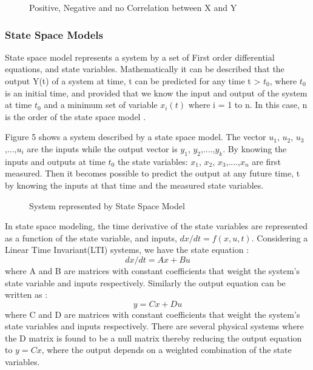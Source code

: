 \documentclass[article,type=msc,colorback,12pt,accentcolor=tud7b]{tudthesis}
\begin{document}
 \begin{figure}
 \begin{center}
  \makebox[\textwidth]{\texttt{[image: B7]}}
\end{center}
\caption{Positive, Negative and no Correlation between X and Y }
\end{figure}

\subsubsection{State Space Models}

State space model represents a system by a set of First order differential equations, and state variables. Mathematically it can be described that the output Y(t) of a system at time, t can be predicted for any time t > $t_0$,  where $t_0$ is an initial time, and provided that we know the input and output of the system at time $t_0$ and a minimum set of variable $x_i(t)$ where i = 1 to n. In this case, n is the order of the state space model \cite{rowell2002state}. 

Figure 5 shows a system described by a state space model. The vector $u_1$, $u_2$, $u_3$,...,$u_i$ are the inputs while the output vector is $y_1$, $y_2$,....,$y_k$. By knowing the inputs and outputs at time $t_0$ the state variables: $x_1$, $x_2$, $x_3$,....,$x_n$ are first measured. Then it becomes possible to predict the output at any future time, t by knowing the inputs at that time and the measured state variables.

 \begin{figure}
 \begin{center}
  \makebox[\textwidth]{\texttt{[image: B6]}}
\end{center}
\caption{System represented by State Space Model}
\end{figure}

In state space modeling, the time derivative of the state variables are represented as a function of the state variable, and inputs, $dx/dt = f(x,u,t)$. Considering a Linear Time Invariant(LTI) systems, we have the state equation \cite{rowell2002state}: $$ dx/dt = Ax + Bu $$ where A and B are matrices with constant coefficients that weight the system's state variable and inputs respectively. Similarly the output equation can be written as \cite{rowell2002state}: $$ y = Cx + Du $$ where C and D are matrices with constant coefficients that weight the system's state variables and inputs respectively. There are several physical systems where the D matrix is found to be a null matrix thereby reducing the output equation to $ y = Cx $, where the output depends on a weighted combination of the state variables.
\end{document}
